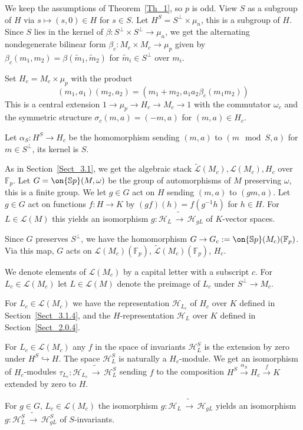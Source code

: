 \documentclass[11pt]{amsart}
\theoremstyle{definition}
\theoremstyle{remark}
\newcommand{\cH}{{\mathcal H}}
\newcommand{\cL}{{\mathcal L}}
\newcommand{\toup}[1]{\stackrel{#1}{\to}}
\newcommand{\hook}[1]{\stackrel{#1}{\hookrightarrow}}
\newcommand{\Sp}{\on{\mathbb{S}p}}
\newcommand{\Fp}{\mathbb{F}_p}  %
\newcommand{\iso}{{\widetilde\to}}
\newcommand{\wt}{\widetilde}
\newcommand{\<}{\langle}
\renewcommand{\>}{\rangle}
\begin{document}
\sssec{} We keep the assumptions of Theorem~\ref{Th_1}, so $p$ is odd. View $S$ as a subgroup of $H$ via $s\mapsto (s,0)\in H$ for $s\in S$. Let $H^S=S^{\perp}\times \mu_n$, this is a subgroup of $H$. Since $S$ lies in the kernel of $\beta:  S^{\perp}\times S^{\perp}\to\mu_n$, we get the alternating nondegenerate bilinear form $\beta_c: M_c\times M_c\to\mu_p$ given by $\beta_c(m_1, m_2)=\beta(\tilde m_1,\tilde m_2)$ for $\tilde m_i\in S^{\perp}$ over $m_i$. 

 Set $H_c=M_c\times \mu_p$ with the product
$$
(m_1, a_1)(m_2, a_2)=(m_1+m_2, a_1a_2\beta_c(m_1 m_2))
$$
This is a central extension $1\to \mu_p\to H_c\to M_c\to 1$ with the commutator $\omega_c$ and the symmetric structure $\sigma_c(m,a)=(-m,a)$ for $(m,a)\in H_c$. 

 Let $\alpha_S: H^S\to H_c$ be the homomorphism sending $(m,a)$ to $(m\!\mod S, a)$ for $m\in S^{\perp}$, its kernel is $S$.  

 As in Section~\ref{Sect_3.1}, we get the algebraic stack $\wt\cL(M_c), \cL(M_c), H_c$ over $\Fp$. Let $G=\Sp(M,\omega)$ be the group of automorphisms of $M$ preserving $\omega$, this is a finite group. We let $g\in G$ act on $H$ sending $(m,a)$ to $(gm, a)$. Let $g\in G$ act on functions $f: H\to K$ by $(gf)(h)=f(g^{-1}h)$ for $h\in H$. For $L\in\cL(M)$ this yields an isomorphism $g: \cH_L\,\iso\, \cH_{gL}$ of $K$-vector spaces. 
 
 Since $G$ preserves $S^{\perp}$, we have the homomorphism $G\to G_c:=\Sp(M_c)(\Fp)$. Via this map, $G$ acts on $\cL(M_c)(\Fp)$, $\wt\cL(M_c)(\Fp)$, $H_c$. 
 
\sssec{} We denote elements of $\cL(M_c)$ by a capital letter with a subscript $c$. For $L_c\in \cL(M_c)$ let $L\in \cL(M)$ denote the preimage of $L_c$ under $S^{\perp}\to M_c$. 

 For $L_c\in \cL(M_c)$ we have the representation $\cH_{L_c}$ of $H_c$ over $K$ defined in Section~\ref{Sect_3.1.4}, and the $H$-representation $\cH_L$ over $K$ defined in Section~\ref{Sect_2.0.4}.    

 For $L_c\in \cL(M_c)$ any $f$ in the space of invariants $\cH_L^S$ is the extension by zero under $H^S\hook{} H$. The space $\cH_L^S$ is naturally a $H_c$-module. We get an isomorphism of $H_c$-modules $\tau_{L_c}: \cH_{L_c}\,\iso\, \cH_L^S$ sending $f$ to the composition $H^S\toup{\alpha_S} H_c\toup{f} K$ extended by zero to $H$. 
 
  For $g\in G$, $L_c\in\cL(M_c)$ the isomorphism $g: \cH_L\,\iso\,\cH_{gL}$ yields an isomorphism $g: \cH_L^S\,\iso\,\cH_{gL}^S$ of $S$-invariants. 
 
\end{document}
